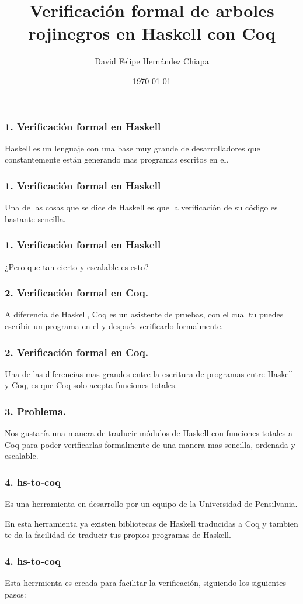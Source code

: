 \documentclass[xcolor=dvipsnames,table,spanish]{beamer}
\title[]{Verificación formal de arboles rojinegros en Haskell con Coq}
\author[]{David Felipe Hernández Chiapa}
\institute[UNAM-FC]{Facultad de Ciencias\\
Universidad Nacional Aut\'onoma de M\'exico}
\date[]{\small{\today}}
\begin{document}
\frame{\titlepage}

\begin{frame}
  \frametitle{1. Verificación formal en Haskell}
    Haskell es un lenguaje con una base muy grande de desarrolladores que constantemente están generando mas programas escritos en el.

\end{frame}

\begin{frame}
  \frametitle{1. Verificación formal en Haskell}
    Una de las cosas que se dice de Haskell es que la verificación de su código es bastante sencilla.
\end{frame}

\begin{frame}
  \frametitle{1. Verificación formal en Haskell}
    \centering¿Pero que tan cierto y escalable es esto?
\end{frame}

\begin{frame}
  \frametitle{2. Verificación formal en Coq.}
	A diferencia de Haskell, Coq es un asistente de pruebas, con el cual tu puedes escribir un programa en el y después verificarlo formalmente. 
\end{frame}

\begin{frame}
  \frametitle{2. Verificación formal en Coq.}
    Una de las diferencias mas grandes entre la escritura de programas entre Haskell y Coq, es que Coq solo acepta funciones totales. 
\end{frame}

\begin{frame}
  \frametitle{3. Problema.}
       Nos gustaría una manera de traducir módulos de Haskell con funciones totales a Coq para poder verificarlas formalmente de una manera mas sencilla, ordenada y escalable.
\end{frame}

\begin{frame}
  \frametitle{4. hs-to-coq}
       Es una herramienta en desarrollo por un equipo de la Universidad de Pensilvania.
       
       En esta herramienta ya existen bibliotecas de Haskell traducidas a Coq y tambien te da la facilidad de traducir tus propios programas de Haskell.
\end{frame}

\begin{frame}
  \frametitle{4. hs-to-coq}
        Esta herrmienta es creada para facilitar la verificación, siguiendo los siguientes pasos:
        
\end{frame}
\end{document}
